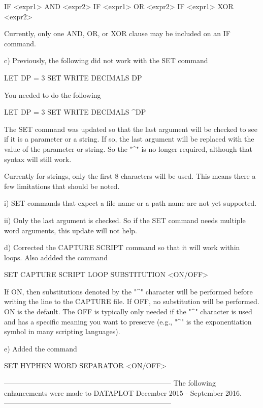           IF <expr1>  AND  <expr2>
          IF <expr1>  OR   <expr2>
          IF <expr1>  XOR  <expr2>

       Currently, only one AND, OR, or XOR clause may be included on
       an IF command.

    c) Previously, the following did not work with the SET command

          LET DP = 3
          SET WRITE DECIMALS DP

       You needed to do the following

          LET DP = 3
          SET WRITE DECIMALS ^DP

       The SET command was updated so that the last argument will
       be checked to see if it is a parameter or a string.  If so,
       the last argument will be replaced with the value of the
       parameter or string.  So the "^" is no longer required,
       although that syntax will still work.

       Currently for strings, only the first 8 characters will be
       used.  This means there a few limitations that should be noted.

          i) SET commands that expect a file name or a path name
             are not yet supported.

         ii) Only the last argument is checked.  So if the SET
             command needs multiple word arguments, this update
             will not help.

    d) Corrected the CAPTURE SCRIPT command so that it will work within
       loops.  Also addded the command

          SET CAPTURE SCRIPT LOOP SUBSTITUTION <ON/OFF>

       If ON, then substitutions denoted by the "^" character will be
       performed before writing the line to the CAPTURE file.  If OFF,
       no substitution will be performed.  ON is the default.  The OFF
       is typically only needed if the "^" character is used and has
       a specific meaning you want to preserve (e.g., "^" is the
       exponentiation symbol in many scripting languages).

    e) Added the command

          SET HYPHEN WORD SEPARATOR <ON/OFF>

-----------------------------------------------------------------------
The following enhancements were made to DATAPLOT
December 2015 - September 2016.
-----------------------------------------------------------------------

